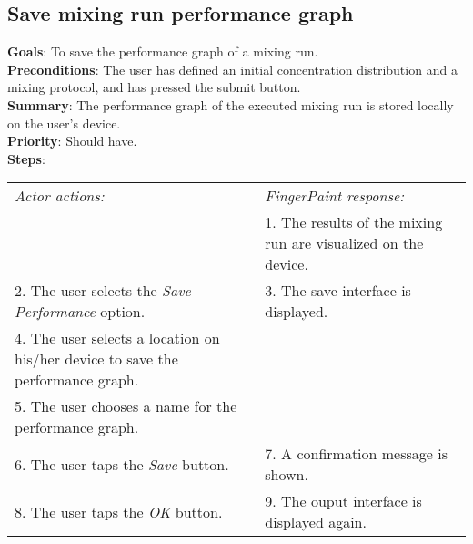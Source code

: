 \begin{appendices}
  \section{Save mixing run performance graph}
  \textbf{Goals}: To save the performance graph of a mixing run.\\
  \textbf{Preconditions}: The user has defined an initial concentration distribution and a mixing protocol, and has pressed the submit button.\\
  \textbf{Summary}: The performance graph of the executed mixing run is stored locally on the user's device.\\
  \textbf{Priority}: Should have.\\
  \textbf{Steps}: \\
  \begin{tabular}{ p{} p{} }
  	\emph{Actor actions:} & \emph{FingerPaint response:} \\
	   & 1. The results of the mixing run are visualized on the device. \\
	 2. The user selects the \emph{Save Performance} option. & 3. The save interface is displayed.\\
	 4. The user selects a location on his/her device to save the performance graph. & \\
	 5. The user chooses a name for the performance graph. & \\
	 6. The user taps the \emph{Save} button. & 7. A confirmation message is shown. \\
	 8. The user taps the \emph{OK} button. & 9. The ouput interface is displayed again. \\
  \end{tabular}
  

\end{appendices}
